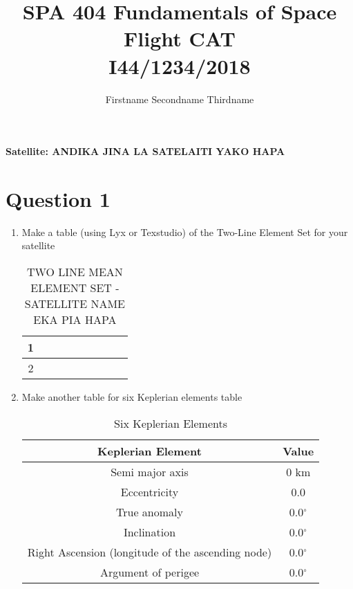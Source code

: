 \documentclass[12pt, a4paper]{article}
\author{Firstname Secondname Thirdname}
\title{SPA 404 Fundamentals of Space Flight CAT \\ I44/1234/2018}
\begin{document}
	\maketitle
	
	\textbf{Satellite: ANDIKA JINA LA SATELAITI YAKO HAPA}
	
	\section*{Question 1}
	
	\begin{enumerate}
		\item Make a table (using Lyx or Texstudio) of the Two-Line Element Set for your satellite
		\begin{table}[ht]
			\centering
			\caption{TWO LINE MEAN ELEMENT SET - SATELLITE NAME EKA PIA HAPA}
			{\renewcommand{\arraystretch}{2}
				\begin{tabular}[t]{|c|c|c|c|c|c|c|c|c|}
					\hline
					1	&	&	&	&	&	&	&	&	\\	%
					\hline
					2	&	&	&	&	&	&	&	&	\\	%
					\hline
			\end{tabular}} \quad
			\label{tab:caption}
		\end{table}
		
		
		\item Make another table for six Keplerian elements table
		\begin{table}[ht]
			\centering
			\caption{Six Keplerian Elements}
			{\renewcommand{\arraystretch}{2}
				\begin{tabular}[t]{|c|c|}
					\hline
					\textbf{Keplerian Element}  & \textbf{Value}\\
					\hline
					Semi major axis  & 0 km\\
					\hline
					Eccentricity & 0.0\\
					\hline
					True anomaly & 0.0$^\circ$\\
					\hline
					Inclination & 0.0$^\circ$\\
					\hline
					Right Ascension (longitude of the ascending node)  & 0.0$^\circ$\\
					\hline
					Argument of perigee  & 0.0$^\circ$\\
					\hline
			\end{tabular}} \quad
			\label{tab:caption2}
		\end{table}
		

\end{enumerate}
\end{document}
